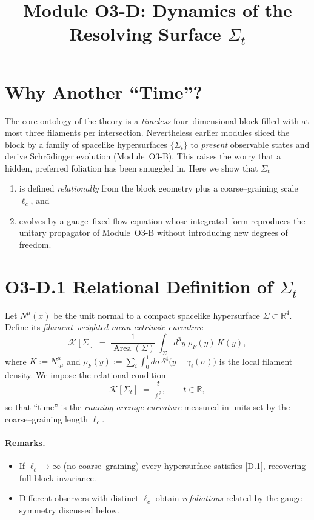 \documentclass[12pt]{article}
\title{Module O3-D: Dynamics of the Resolving Surface $\Sigma_t$}
\author{}
\date{}
\begin{document}
\maketitle

\section*{Why Another ``Time''?}
The core ontology of the theory is a \emph{timeless} four--dimensional block filled with at most three filaments per intersection.  
Nevertheless earlier modules sliced the block by a family of spacelike hypersurfaces $\{\Sigma_t\}$ to \emph{present} observable states and derive Schrödinger evolution (Module~O3-B).  
This raises the worry that a hidden, preferred foliation has been smuggled in.  
Here we show that $\Sigma_t$
\begin{enumerate}
  \item is defined \emph{relationally} from the block geometry plus a coarse--graining scale $\ell_c$, and
  \item evolves by a gauge--fixed flow equation whose integrated form reproduces the unitary propagator of Module~O3-B without introducing new degrees of freedom.
\end{enumerate}

\section*{O3-D.1 \quad Relational Definition of $\Sigma_t$}

Let $N^\mu(x)$ be the unit normal to a compact spacelike hypersurface $\Sigma\subset\mathbb R^{4}$.  
Define its \emph{filament--weighted mean extrinsic curvature}
\[
  \mathcal K[\Sigma] \;=\;
  \frac{1}{\operatorname{Area}(\Sigma)}\,
  \int_{\Sigma}\! d^{3}y\;
  \rho_F(y)\,K(y),
\]
where $K := N^\mu_{;\mu}$ and
$\rho_F(y) := \sum_i \int_0^1 d\sigma\,
  \delta^{4}\!\bigl(y-\gamma_i(\sigma)\bigr)$
is the local filament density.
We impose the relational condition
\[
  \mathcal K[\Sigma_t] \;=\; \frac{t}{\ell_c^{2}}, \qquad t\in\mathbb R,
\tag{D.1}
\]
so that ``time'' is the \emph{running average curvature} measured in units set by the coarse--graining length $\ell_c$.

\paragraph{Remarks.}
\begin{itemize}
  \item If $\ell_c\to\infty$ (no coarse--graining) every hypersurface satisfies \eqref{D.1}, recovering full block invariance.
  \item Different observers with distinct $\ell_c$ obtain \emph{refoliations} related by the gauge symmetry discussed below.
\end{itemize}
\end{document}
